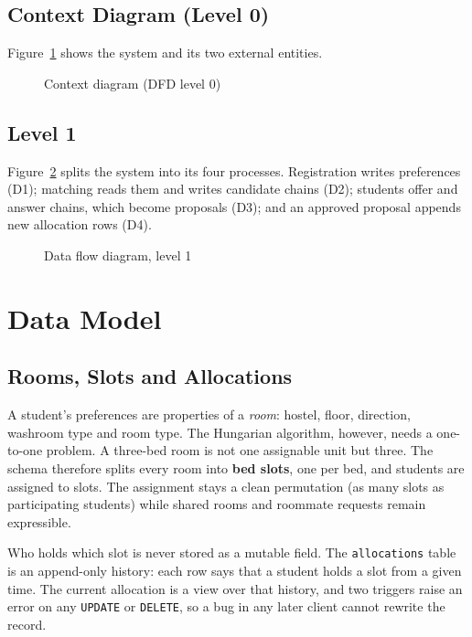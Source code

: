 \subsection{Context Diagram (Level 0)}

Figure~\ref{fig:dfd0} shows the system and its two external entities.

\begin{figure}[H]
\centering
\resizebox{0.95\textwidth}{!}{}
\caption{Context diagram (DFD level 0)}
\label{fig:dfd0}
\end{figure}

\subsection{Level 1}

Figure~\ref{fig:dfd1} splits the system into its four processes.
Registration writes preferences (D1); matching reads them and writes
candidate chains (D2); students offer and answer chains, which become
proposals (D3); and an approved proposal appends new allocation rows
(D4).

\begin{figure}[H]
\centering
\resizebox{0.95\textwidth}{!}{}
\caption{Data flow diagram, level 1}
\label{fig:dfd1}
\end{figure}

\section{Data Model}

\subsection{Rooms, Slots and Allocations}
\label{sec:bed-slot}

A student's preferences are properties of a \emph{room}: hostel, floor,
direction, washroom type and room type. The Hungarian algorithm,
however, needs a one-to-one problem. A three-bed room is not one
assignable unit but three. The schema therefore splits every room into
\textbf{bed slots}, one per bed, and students are assigned to slots. The
assignment stays a clean permutation (as many slots as participating
students) while shared rooms and roommate requests remain expressible.

Who holds which slot is never stored as a mutable field. The
\texttt{allocations} table is an append-only history: each row says that
a student holds a slot from a given time. The current allocation is a
view over that history, and two triggers raise an error on any
\texttt{UPDATE} or \texttt{DELETE}, so a bug in any later client cannot
rewrite the record.

